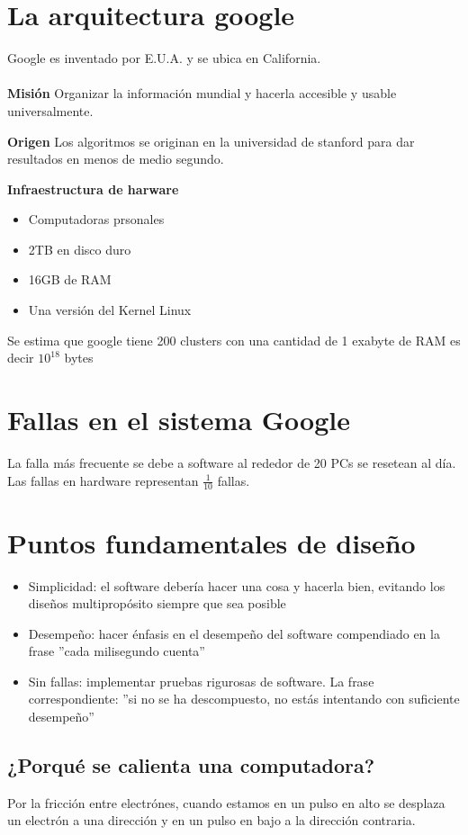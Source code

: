 \section{La arquitectura google}
Google es inventado por E.U.A. y se ubica en California.\\\\

\textbf{Misión}
Organizar la información mundial y hacerla accesible y usable universalmente.

\textbf{Origen}
Los algoritmos se originan en la universidad de stanford para dar resultados en menos de medio segundo.

\textbf{Infraestructura de harware}
\begin{itemize}
    \item {Computadoras prsonales}
    \item {2TB en disco duro}
    \item {16GB de RAM}
    \item {Una versión del Kernel Linux}
\end{itemize}

Se estima que google tiene 200 clusters con una cantidad de 1 exabyte de RAM es decir $10^{18}$ bytes

\section{Fallas en el sistema Google}
La falla más frecuente se debe a software al rededor de 20 PCs se resetean al día. Las fallas en hardware representan $\frac{1}{10}$ fallas.

\section{Puntos fundamentales de diseño}
\begin{itemize}
    \item {Simplicidad: el software debería hacer una cosa y hacerla bien, evitando los diseños multipropósito siempre que sea posible}
    \item {Desempeño: hacer énfasis en el desempeño del software compendiado en la frase ''cada milisegundo cuenta''}
    \item {Sin fallas: implementar pruebas rigurosas de software. La frase correspondiente: ''si no se ha descompuesto, no estás intentando con suficiente desempeño''}
\end{itemize}

\subsection{¿Porqué se calienta una computadora?}
Por la fricción entre electrónes, cuando estamos en un pulso en alto se desplaza un electrón a una dirección y en un pulso en bajo a la dirección contraria.


